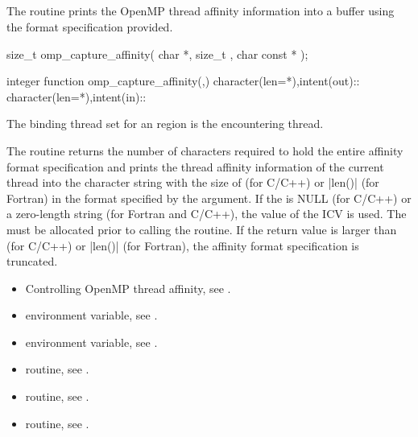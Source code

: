 \subsection{}
\label{subsec:omp_capture_affinity}

\summary
The  routine prints the OpenMP thread affinity information into a buffer using
the format specification provided.

\newpage %
\format
\begin{ccppspecific}
\begin{ompcFunction}
size_t omp_capture_affinity(
  char *,
  size_t ,
  char const *
);
\end{ompcFunction}
\end{ccppspecific}

\begin{fortranspecific}
\begin{ompfFunction}
integer function omp_capture_affinity(,)
character(len=*),intent(out)::
character(len=*),intent(in)::
\end{ompfFunction}
\end{fortranspecific}

\binding
The binding thread set for an  region is the encountering thread.

\effect
The  routine returns the number of characters required to hold
the entire affinity format specification and prints the thread affinity information of the current thread
into the character string  with the size of
 (for C/C++) or {\code|len()|} (for Fortran) 
in the format specified by the  argument.
If the  is NULL (for C/C++)
or a zero-length string (for Fortran and C/C++), the value of the  ICV is used.
The  must be allocated prior to calling the routine.
If the return value is larger than  (for C/C++) or {\code|len()|} (for Fortran), the 
affinity format specification is truncated.

\crossreferences
\begin{itemize}
\item Controlling OpenMP thread affinity, see 
. 
\item {} environment variable, see 
.
\item {} environment variable, see 
.
\item {} routine, see .
\item {} routine, see .
\item {} routine, see .
\end{itemize}


